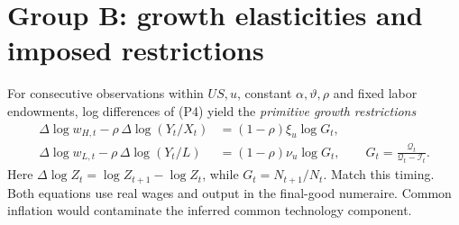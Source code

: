 \documentclass[10pt,a4paper,landscape]{article}
\newcommand{\Q}{\mathcal Q}\newcommand{\I}{\mathcal I}\newcommand{\D}{\mathcal D}
\newcommand{\dd}{\Delta\log}
\begin{document}
\section{Group B: growth elasticities and imposed restrictions}\label{sec:growth}
For consecutive observations within $US,u$, constant $\alpha,\vartheta,\rho$ and fixed labor endowments, log differences of (P4) yield the \emph{primitive growth restrictions}
\begin{equation}\label{eq:growth}
\begin{aligned}
 \dd w_{H,t}-\rho\,\dd(Y_t/X_t)&=(1-\rho)\xi_u\log G_t,\\
 \dd w_{L,t}-\rho\,\dd(Y_t/L)&=(1-\rho)\nu_u\log G_t,
 \qquad G_t=\frac{\Q_t}{\Q_t-\I_t}.
\end{aligned}\tag{P5}
\end{equation}
Here $\dd Z_t=\log Z_{t+1}-\log Z_t$, while $G_t=N_{t+1}/N_t$. Match this timing. Both equations use real wages and output in the final-good numeraire. Common inflation would contaminate the inferred common technology component.
\end{document}
